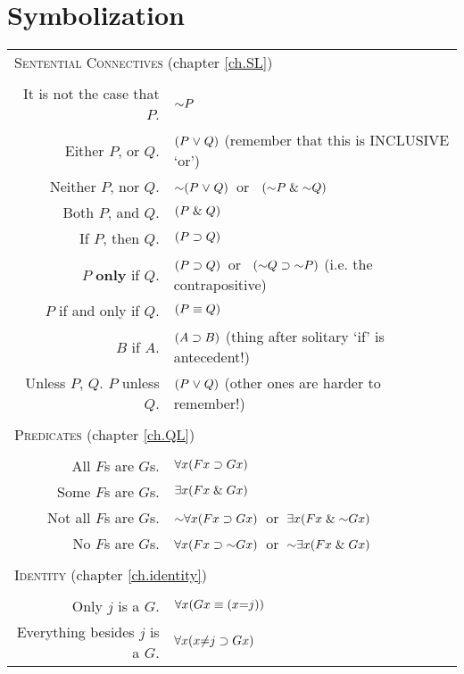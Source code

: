 
\section*{Symbolization}
\label{app.symbolization}
\begin{tabular*}{\textwidth}{rl}
\multicolumn{2}{l}{\textsc{Sentential Connectives} (chapter \ref{ch.SL})}\\ \\
It is not the case that $P$. & $\enot P$\\
Either $P$, or $Q$. & $(P \mkern1mu\vee\mkern1mu Q)$ (remember that this is INCLUSIVE `or') \\
Neither $P$, nor $Q$. & $\enot(P \eor Q)$\ or \ $(\enot P \eand \enot Q)$\\
Both $P$, and $Q$. & $(P \mathrel\& Q)$\\
If $P$, then $Q$. & $(P \supset Q)$\\
$P$ \textbf{only} if $Q$. & $(P \supset Q)$\ or \ $(\enot Q \eif \enot P)$ (i.e. the contrapositive) \\
$P$ if and only if $Q$. & $(P \equiv Q)$\\
$B$ if $A$. & $(A \supset B)$ (thing after solitary `if' is antecedent!) \\
Unless $P$, $Q$. $P$ unless $Q$. & $(P \mkern1mu\vee\mkern1mu Q)$ (other ones are harder to remember!) \\
\\
\multicolumn{2}{l}{\label{SymbolizingPredicates}\textsc{Predicates} (chapter \ref{ch.QL})}\\ \\
All $F$s are $G$s. & $\forall x(Fx \supset Gx)$\\
Some $F$s are $G$s. & $\exists x(Fx \mathrel\& Gx)$\\
Not all $F$s are $G$s. & $\enot\qt{\forall}{x}(Fx \eif Gx)$\ or\ $\qt{\exists}{x}(Fx \eand \enot Gx)$\\
No $F$s are $G$s. & $\qt{\forall}{x}(Fx \eif\enot Gx)$\ or\ $\enot\qt{\exists}{x}(Fx \eand Gx)$\\
\\
\multicolumn{2}{l}{\textsc{Identity} (chapter \ref{ch.identity})}\\ \\
Only $j$ is a $G$. & $\forall x(Gx \equiv (x{=}j))$\\
Everything besides $j$ is a $G$. & $\forall x(x {\neq} j \supset Gx)$\\

\end{tabular*}
